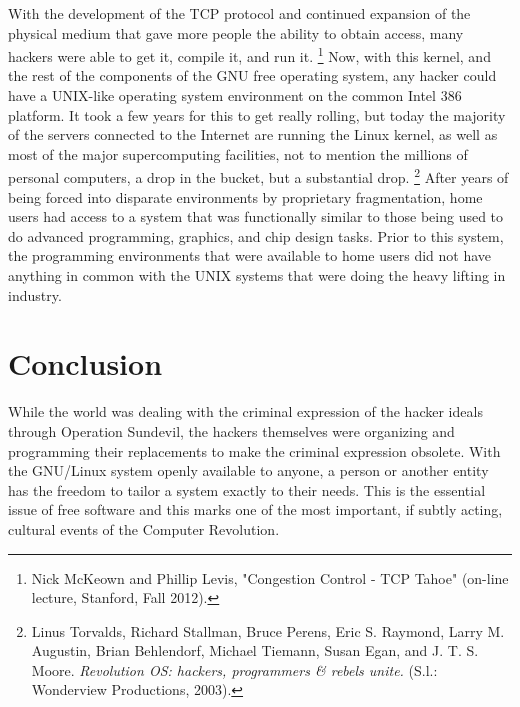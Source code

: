 \documentclass[11pt]{article}
\begin{document}
With the development of the TCP protocol and continued expansion of the physical medium that gave more people the ability to obtain access, many hackers were able to get it, compile it, and run it.
\footnote{Nick McKeown and Phillip Levis, "Congestion Control - TCP Tahoe" (on-line lecture, Stanford, Fall 2012).} 
Now, with this kernel, and the rest of the components of the GNU free operating system, any hacker could have a UNIX-like operating system environment on the common Intel 386 platform. It took a few years for this to get really rolling, but today the majority of the servers connected to the Internet are running the Linux kernel, as well as most of the major supercomputing facilities, not to mention the millions of personal computers, a drop in the bucket, but a substantial drop.
\footnote{Linus Torvalds, Richard Stallman, Bruce Perens, Eric S. Raymond, Larry M. Augustin, Brian Behlendorf, Michael Tiemann, Susan Egan, and J. T. S. Moore. \emph{Revolution OS: hackers, programmers \& rebels unite.} (S.l.: Wonderview Productions, 2003).}
After years of being forced into disparate environments by proprietary fragmentation, home users had access to a system that was functionally similar to those being used to do advanced programming, graphics, and chip design tasks. Prior to this system, the programming environments that were available to home users did not have anything in common with the UNIX systems that were doing the heavy lifting in industry.

\newpage

\section{Conclusion}

While the world was dealing with the criminal expression of the hacker ideals through Operation Sundevil, the hackers themselves were organizing and programming their replacements to make the criminal expression obsolete. With the GNU/Linux system openly available to anyone, a person or another entity has the freedom to tailor a system exactly to their needs. This is the essential issue of free software and this marks one of the most important, if subtly acting, cultural events of the Computer Revolution.
\end{document}
